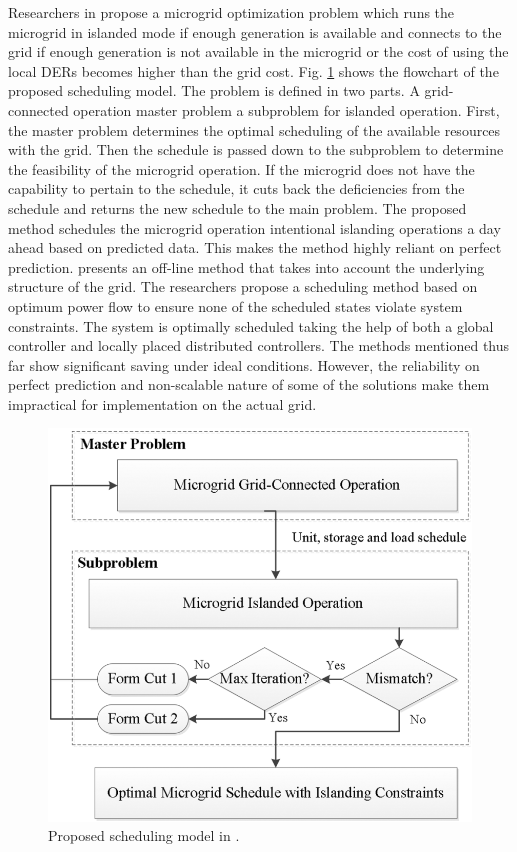 Researchers in \cite{AKh14} propose a microgrid optimization problem which runs the microgrid in islanded mode if enough generation is available and connects to the grid if enough generation is not available in the microgrid or the cost of using the local DERs becomes higher than the grid cost. Fig. \ref{fig:OFF_2}  shows the flowchart of the proposed scheduling model. The problem is defined in two parts. A grid-connected operation master problem a subproblem for islanded operation. First, the master problem determines the optimal scheduling of the available resources with the grid. Then the schedule is passed down to the subproblem to determine the feasibility of the microgrid operation. If the microgrid does not have the capability to pertain to the schedule, it cuts back the deficiencies from the schedule and returns the new schedule to the main problem.  The proposed method schedules the microgrid operation intentional islanding operations a day ahead based on predicted data. This makes the method highly reliant on perfect prediction. \cite{WSh15} presents an off-line method that takes into account the underlying structure of the grid. The researchers propose a scheduling method based on optimum power flow to ensure none of the scheduled states violate system constraints. The system is optimally scheduled taking the help of both a global controller and locally placed distributed controllers. The methods mentioned thus far show significant saving under ideal conditions. However, the reliability on perfect prediction and non-scalable nature of some of the solutions make them impractical for implementation on the actual grid.

\begin{figure}[!h]
\centering
\includegraphics[width=0.5\linewidth]{figs/OFF_2.png}
\caption[Proposed scheduling model]{Proposed scheduling model  in \cite{AKh14}.}
\label{fig:OFF_2}
\end{figure}

